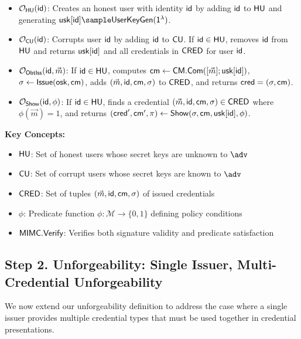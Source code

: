 \begin{itemize}
    \item $\mathcal{O}_{\mathsf{HU}}(\mathsf{id})$: Creates an honest user with identity $\mathsf{id}$ by adding $\mathsf{id}$ to $\mathsf{HU}$ and generating $\usk[\id] \sample \UserKeyGen(\secparam)$.
    
    \item $\mathcal{O}_{\mathsf{CU}}(\mathsf{id})$: Corrupts user $\mathsf{id}$ by adding $\mathsf{id}$ to $\mathsf{CU}$. If $\mathsf{id} \in \mathsf{HU}$, removes $\mathsf{id}$ from $\mathsf{HU}$ and returns $\mathsf{usk}[\mathsf{id}]$ and all credentials in $\mathsf{CRED}$ for user $\mathsf{id}$.
    
    \item $\mathcal{O}_{\mathsf{ObtIss}}(\mathsf{id}, \vec{m})$: If $\mathsf{id} \in \mathsf{HU}$, computes $\mathsf{cm} \gets \mathsf{CM.Com}([\vec{m}]; \mathsf{usk}[\mathsf{id}])$, $\sigma \gets \mathsf{Issue}(\mathsf{osk}, \mathsf{cm})$, adds $(\vec{m}, \mathsf{id}, \mathsf{cm}, \sigma)$ to $\mathsf{CRED}$, and returns $\mathsf{cred} = (\sigma, \mathsf{cm})$.
    
    \item $\mathcal{O}_{\mathsf{Show}}(\mathsf{id}, \phi)$: If $\mathsf{id} \in \mathsf{HU}$, finds a credential $(\vec{m}, \mathsf{id}, \mathsf{cm}, \sigma) \in \mathsf{CRED}$ where $\phi(\vec{m}) = 1$, and returns $(\mathsf{cred}', \mathsf{cm}', \pi) \gets \mathsf{Show}(\sigma, \mathsf{cm}, \mathsf{usk}[\mathsf{id}], \phi)$.
\end{itemize}

\noindent \textbf{Key Concepts:}
\begin{itemize}
    \item $\mathsf{HU}$: Set of honest users whose secret keys are unknown to $\adv$
    \item $\mathsf{CU}$: Set of corrupt users whose secret keys are known to $\adv$
    \item $\mathsf{CRED}$: Set of tuples $(\vec{m}, \mathsf{id}, \mathsf{cm}, \sigma)$ of issued credentials
    \item $\phi$: Predicate function $\phi: \mathcal{M} \rightarrow \{0,1\}$ defining policy conditions
    \item $\mathsf{MIMC.Verify}$: Verifies both signature validity and predicate satisfaction
\end{itemize}








\newpage
\subsection{Step 2. Unforgeability: Single Issuer, Multi-Credential Unforgeability}

We now extend our unforgeability definition to address the case where a single issuer provides multiple credential types that must be used together in credential presentations.

